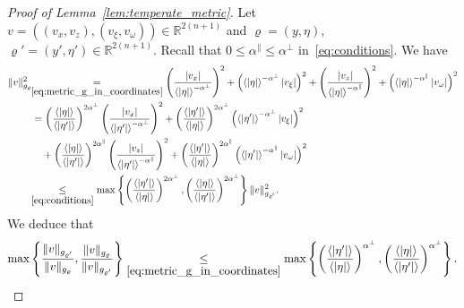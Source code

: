 \documentclass[10pt]{amsart}
\theoremstyle{definition}\newtheorem{defi}[theo]{Definition}\newtheorem{rema}[theo]{Remark}\newtheorem{exam}[theo]{Example}\newtheorem{exem}[theo]{Example}\newtheorem{nota}[theo]{Notation}
\newcommand{\bbR}{\mathbb{R}}
\begin{document}
\begin{proof}[Proof of Lemma~\ref{lem:temperate_metric}]
Let $v=((v_{x},v_{z}),(v_{\xi},v_{\omega}))\in\bbR^{2(n+1)}$ and $\varrho=(y,\eta),$ $\varrho'=(y',\eta')\in\bbR^{2(n+1)}$. Recall that $0\leq\alpha^{\parallel}\leq\alpha^{\perp}$ in~\eqref{eq:conditions}. We have
\begin{align*}
\|v\|_{g_{\varrho}}^{2} &\!\!\underset{\eqref{eq:metric_g_in_coordinates}}{=} \left(\frac{\left|v_{x}\right|}{\left\langle \left|\eta\right|\right\rangle ^{-\alpha^{\perp}}}\right)^{2}+\left(\left\langle \left|\eta\right|\right\rangle ^{-\alpha^{\perp}}\left|v_{\xi}\right|\right)^{2}+\left(\frac{\left|v_{z}\right|}{\left\langle \left|\eta\right|\right\rangle ^{-\alpha^{\parallel}}}\right)^{2}+\left(\left\langle \left|\eta\right|\right\rangle ^{-\alpha^{\parallel}}\left|v_{\omega}\right|\right)^{2}\\
&= \left(\frac{\left\langle \left|\eta\right|\right\rangle }{\left\langle \left|\eta'\right|\right\rangle }\right)^{2\alpha^{\perp}}\left(\frac{\left|v_{x}\right|}{\left\langle \left|\eta'\right|\right\rangle ^{-\alpha^{\perp}}}\right)^{2}+\left(\frac{\left\langle \left|\eta'\right|\right\rangle }{\left\langle \left|\eta\right|\right\rangle }\right)^{2\alpha^{\perp}}\left(\left\langle \left|\eta'\right|\right\rangle ^{-\alpha^{\perp}}\left|v_{\xi}\right|\right)^{2}\\
& \quad +\left(\frac{\left\langle \left|\eta\right|\right\rangle }{\left\langle \left|\eta'\right|\right\rangle }\right)^{2\alpha^{\parallel}}\left(\frac{\left|v_{z}\right|}{\left\langle \left|\eta'\right|\right\rangle ^{-\alpha^{\parallel}}}\right)^{2}+\left(\frac{\left\langle \left|\eta'\right|\right\rangle }{\left\langle \left|\eta\right|\right\rangle }\right)^{2\alpha^{\parallel}}\left(\left\langle \left|\eta'\right|\right\rangle ^{-\alpha^{\parallel}}\left|v_{\omega}\right|\right)^{2}\\
&\!\!\underset{\eqref{eq:conditions}}{\leq}  \max\left\{ \left(\frac{\langle|\eta'|\rangle}{\langle|\eta|\rangle}\right)^{2\alpha^{\perp}},\left(\frac{\langle|\eta|\rangle}{\langle|\eta'|\rangle}\right)^{2\alpha^{\perp}}\right\} \|v\|_{g_{\varrho'}}^{2}.
\end{align*}
We deduce that
\begin{equation}\label{eq:comparison}
\max\left\{ \frac{\|v\|_{g_{\varrho'}}}{\|v\|_{g_{\varrho}}},\frac{\|v\|_{g_{\varrho}}}{\|v\|_{g_{\varrho'}}}\right\} \underset{\eqref{eq:metric_g_in_coordinates}}{\leq}\max\left\{ \left(\frac{\langle|\eta'|\rangle}{\langle|\eta|\rangle}\right)^{\alpha^{\perp}},\left(\frac{\langle|\eta|\rangle}{\langle|\eta'|\rangle}\right)^{\alpha^{\perp}}\right\}.

\end{equation}
\end{proof}
\end{document}
